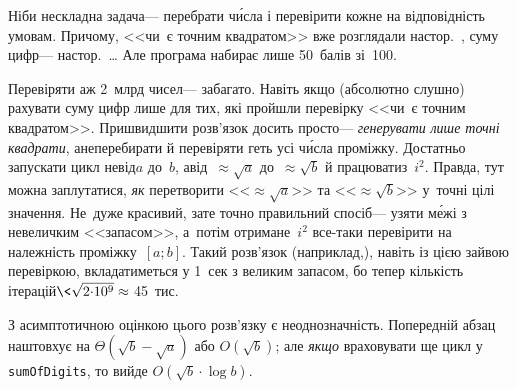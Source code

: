 \Tutorial	Ніби нескладна задача\nolinebreak[3] --- перебрати ч\'{и}сла і перевірити кожне на відповідність умовам. Причому, <<чи~є точним квадратом>> вже розглядали на\nolinebreak[3] стор.~\pageref{text:how-to-test-if-sqrt-N-integer}, суму цифр\nolinebreak[3] --- на\nolinebreak[3] стор.~\pageref{text:sum-of-digits}\dots{}
Але програма  набирає лише 50~балів зі~100.

Перевіряти аж 2~млрд чисел\nolinebreak[3] --- забагато. Навіть якщо (абсолютно слушно) рахувати суму цифр лише для тих, які пройшли перевірку <<чи~є точним квадратом>>. Пришвидшити розв'язок досить просто\nolinebreak[3] --- \emph{генерувати} \emph{лише точні квадрати}, а\nolinebreak[3] не\nolinebreak[3] перебирати й перевіряти геть усі ч\'{и}сла проміжку.
\label{note:not-check-but-generate-squares}
Достатньо запускати цикл не\nolinebreak[3] від\nolinebreak[3] $a$ до~$b$, а\nolinebreak[2] від~${\approx}\sqrt{a}$ до~${\approx}\sqrt{b}$ й працювати\nolinebreak[2] з~$i^2$. Правда, тут можна заплутатися, \emph{як} перетворити <<${\approx}\sqrt{a}$>> та <<${\approx}\sqrt{b}$>> у~точні цілі значення. Не~дуже красивий, зате точно правильний спосіб\nolinebreak[3] --- узяти м\'{е}жі з невеличким <<запасом>>, а~потім отримане~$i^2$ все-таки перевірити на належність проміжку~\mbox{$[a; b]$}. Такий розв'язок (наприклад,\nolinebreak[2] ), навіть із цією зайвою перевіркою, вкладатиметься у 1~сек з великим запасом, бо тепер кількість ітерацій${}\<\sqrt{2{\cdot}10^9}\approx{}$45~тис.


З асимптотичною оцінкою цього розв'язку є неоднозначність. Попередній абзац наштовхує на ${\Theta(\sqrt{b}-\sqrt{a})}$ або $O(\sqrt{b})$; але \emph{якщо} враховувати ще цикл у \texttt{sumOfDigits}, то вийде $O(\sqrt{b}\cdot\log{}b)$. 
